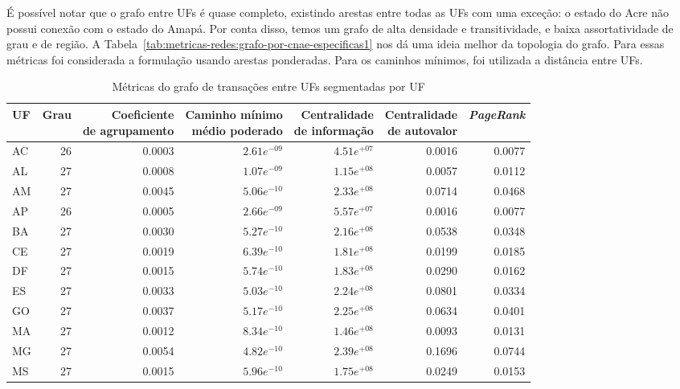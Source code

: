 É possível notar que o grafo entre UFs é quase completo, existindo arestas entre todas as UFs com uma exceção: o estado do Acre não possui conexão com o estado do Amapá. Por conta disso, temos um grafo de alta densidade e transitividade, e baixa assortatividade de grau e de região. A Tabela~\ref{tab:metricas-redes:grafo-por-cnae-especificas1} nos dá uma ideia melhor da topologia do grafo. Para essas métricas foi considerada a formulação usando arestas ponderadas. Para os caminhos mínimos, foi utilizada a distância entre UFs.

\begin{table}[htb]
\centering
\caption{Métricas do grafo de transações entre UFs segmentadas por UF}
\label{tab:metricas-redes:grafo-por-uf-especificas1}
    \begin{tabular}{l|rrrrrr}
    \toprule
    UF & Grau & \shortstack{Coeficiente\\de agrupamento} &  \shortstack{Caminho mínimo\\ médio poderado} & \shortstack{Centralidade\\de informação} &  \shortstack{Centralidade\\de autovalor} &  \textit{PageRank} \\
    \midrule
    AC & 26 & 0.0003 & $2.61e^{-09}$ & $4.51e^{+07}$ & 0.0016 & 0.0077 \\
    AL & 27 & 0.0008 & $1.07e^{-09}$ & $1.15e^{+08}$ & 0.0057 & 0.0112 \\
    AM & 27 & 0.0045 & $5.06e^{-10}$ & $2.33e^{+08}$ & 0.0714 & 0.0468 \\
    AP & 26 & 0.0005 & $2.66e^{-09}$ & $5.57e^{+07}$ & 0.0016 & 0.0077 \\
    BA & 27 & 0.0030 & $5.27e^{-10}$ & $2.16e^{+08}$ & 0.0538 & 0.0348 \\
    CE & 27 & 0.0019 & $6.39e^{-10}$ & $1.81e^{+08}$ & 0.0199 & 0.0185 \\
    DF & 27 & 0.0015 & $5.74e^{-10}$ & $1.83e^{+08}$ & 0.0290 & 0.0162 \\
    ES & 27 & 0.0033 & $5.03e^{-10}$ & $2.24e^{+08}$ & 0.0801 & 0.0334 \\
    GO & 27 & 0.0037 & $5.17e^{-10}$ & $2.25e^{+08}$ & 0.0634 & 0.0401 \\
    MA & 27 & 0.0012 & $8.34e^{-10}$ & $1.46e^{+08}$ & 0.0093 & 0.0131 \\
    MG & 27 & 0.0054 & $4.82e^{-10}$ & $2.39e^{+08}$ & 0.1696 & 0.0744 \\
    MS & 27 & 0.0015 & $5.96e^{-10}$ & $1.75e^{+08}$ & 0.0249 & 0.0153 \\

\end{tabular}
\end{table}
